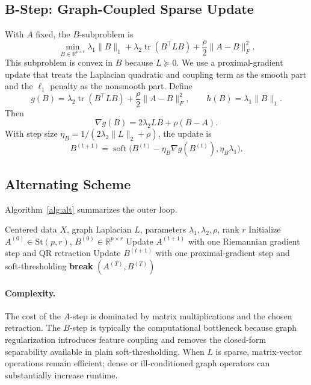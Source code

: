 \documentclass[10pt,twocolumn,letterpaper]{article}
\theoremstyle{definition}
\newcommand{\R}{\mathbb{R}}
\newcommand{\stiefel}{\mathrm{St}}
\DeclareMathOperator{\soft}{soft}
\DeclareMathOperator{\tr}{tr}
\begin{document}
\subsection{B-Step: Graph-Coupled Sparse Update}
With $A$ fixed, the $B$-subproblem is
\begin{equation}
\label{eq:B_subproblem}
\min_{B \in \R^{p \times r}}
\lambda_1 \|B\|_1
+ \lambda_2 \tr(B^\top L B)
+ \frac{\rho}{2}\|A-B\|_F^2.
\end{equation}
This subproblem is convex in $B$ because $L \succeq 0$. We use a proximal-gradient update that treats the Laplacian quadratic and coupling term as the smooth part and the $\ell_1$ penalty as the nonsmooth part. Define
\[
g(B) = \lambda_2 \tr(B^\top L B) + \frac{\rho}{2}\|A-B\|_F^2,
 \qquad
h(B) = \lambda_1 \|B\|_1.
\]
Then
\[
\nabla g(B) = 2\lambda_2 L B + \rho(B-A).
\]
With step size $\eta_B = 1 / (2\lambda_2 \|L\|_2 + \rho)$, the update is
\[
B^{(t+1)} = \soft\!\big(B^{(t)} - \eta_B \nabla g(B^{(t)}), \eta_B \lambda_1\big).
\]

\subsection{Alternating Scheme}
Algorithm~\ref{alg:alt} summarizes the outer loop.

\begin{algorithm}[t]
\caption{Alternating Manifold + Graph-Coupled Sparse Updates}
\label{alg:alt}
\begin{algorithmic}[1]
\Require Centered data $X$, graph Laplacian $L$, parameters $\lambda_1,\lambda_2,\rho$, rank $r$
\State Initialize $A^{(0)} \in \stiefel(p,r)$, $B^{(0)} \in \R^{p\times r}$
\State Update $A^{(t+1)}$ with one Riemannian gradient step and QR retraction
\State Update $B^{(t+1)}$ with one proximal-gradient step and soft-thresholding
        \State \textbf{break}
    \EndIf
\EndFor
\State \Return $(A^{(T)},B^{(T)})$
\end{algorithmic}
\end{algorithm}

\paragraph{Complexity.}
The cost of the $A$-step is dominated by matrix multiplications and the chosen retraction. The $B$-step is typically the computational bottleneck because graph regularization introduces feature coupling and removes the closed-form separability available in plain soft-thresholding. When $L$ is sparse, matrix-vector operations remain efficient; dense or ill-conditioned graph operators can substantially increase runtime.
\end{document}
